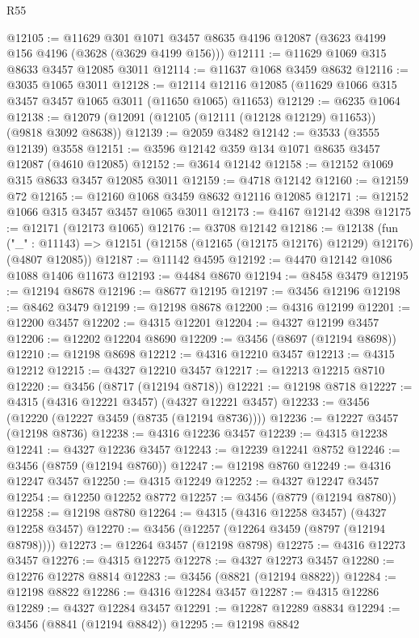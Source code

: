 \begin{lexlean}{R55}
\begin{coremodule}
@12105 := @11629
    @301
    @1071
    @3457
    @8635
    @4196
    @12087
    (@3623 @4199 @156 @4196 (@3628 (@3629 @4199 @156)))
@12111 := @11629 @1069 @315 @8633 @3457 @12085 @3011
@12114 := @11637 @1068 @3459 @8632
@12116 := @3035 @1065 @3011
@12128 := @12114 @12116 @12085 (@11629 @1066 @315 @3457 @3457 @1065 @3011 (@11650 @1065) @11653)
@12129 := @6235 @1064
@12138 := @12079 (@12091 (@12105 (@12111 (@12128 @12129) @11653)) (@9818 @3092 @8638))
@12139 := @2059 @3482
@12142 := @3533 (@3555 @12139) @3558
@12151 := @3596 @12142 @359 @134 @1071 @8635 @3457 @12087 (@4610 @12085)
@12152 := @3614 @12142
@12158 := @12152 @1069 @315 @8633 @3457 @12085 @3011
@12159 := @4718 @12142
@12160 := @12159 @72
@12165 := @12160 @1068 @3459 @8632 @12116 @12085
@12171 := @12152 @1066 @315 @3457 @3457 @1065 @3011
@12173 := @4167 @12142 @398
@12175 := @12171 (@12173 @1065)
@12176 := @3708 @12142
@12186 := @12138
    (fun ("_" : @11143) => @12151 (@12158 (@12165 (@12175 @12176) @12129) @12176) (@4807 @12085))
@12187 := @11142 @4595
@12192 := @4470 @12142 @1086 @1088 @1406 @11673
@12193 := @4484 @8670
@12194 := @8458 @3479
@12195 := @12194 @8678
@12196 := @8677 @12195
@12197 := @3456 @12196
@12198 := @8462 @3479
@12199 := @12198 @8678
@12200 := @4316 @12199
@12201 := @12200 @3457
@12202 := @4315 @12201
@12204 := @4327 @12199 @3457
@12206 := @12202 @12204 @8690
@12209 := @3456 (@8697 (@12194 @8698))
@12210 := @12198 @8698
@12212 := @4316 @12210 @3457
@12213 := @4315 @12212
@12215 := @4327 @12210 @3457
@12217 := @12213 @12215 @8710
@12220 := @3456 (@8717 (@12194 @8718))
@12221 := @12198 @8718
@12227 := @4315 (@4316 @12221 @3457) (@4327 @12221 @3457)
@12233 := @3456 (@12220 (@12227 @3459 (@8735 (@12194 @8736))))
@12236 := @12227 @3457 (@12198 @8736)
@12238 := @4316 @12236 @3457
@12239 := @4315 @12238
@12241 := @4327 @12236 @3457
@12243 := @12239 @12241 @8752
@12246 := @3456 (@8759 (@12194 @8760))
@12247 := @12198 @8760
@12249 := @4316 @12247 @3457
@12250 := @4315 @12249
@12252 := @4327 @12247 @3457
@12254 := @12250 @12252 @8772
@12257 := @3456 (@8779 (@12194 @8780))
@12258 := @12198 @8780
@12264 := @4315 (@4316 @12258 @3457) (@4327 @12258 @3457)
@12270 := @3456 (@12257 (@12264 @3459 (@8797 (@12194 @8798))))
@12273 := @12264 @3457 (@12198 @8798)
@12275 := @4316 @12273 @3457
@12276 := @4315 @12275
@12278 := @4327 @12273 @3457
@12280 := @12276 @12278 @8814
@12283 := @3456 (@8821 (@12194 @8822))
@12284 := @12198 @8822
@12286 := @4316 @12284 @3457
@12287 := @4315 @12286
@12289 := @4327 @12284 @3457
@12291 := @12287 @12289 @8834
@12294 := @3456 (@8841 (@12194 @8842))
@12295 := @12198 @8842

\end{coremodule}
\end{lexlean}

